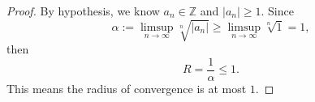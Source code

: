 \begin{Exercise}
\begin{proof}
By hypothesis, we know $a_n\in\mathbb{Z}$ and $|a_n|\geq 1$. Since
$$
\alpha := \limsup_{n\to\infty} \sqrt[n]{|a_n|}
\geq \limsup_{n\to\infty} \sqrt[n]{1}
= 1,
$$
then
$$
R = \frac{1}{\alpha}
\leq 1.
$$
This means the radius of convergence is at most $1$.
\end{proof}
\end{Exercise}